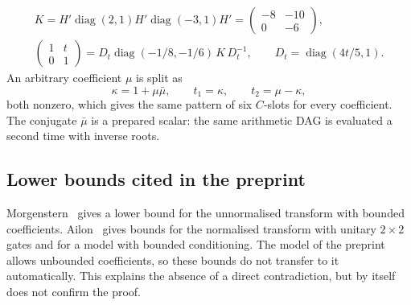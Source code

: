 \documentclass[11pt]{article}
\theoremstyle{plain}
\DeclareMathOperator{\diag}{diag}
\begin{document}
\begin{itemize}
\begin{equation}
\begin{gathered}
K=H'\diag(2,1)H'\diag(-3,1)H'=\begin{pmatrix}-8&-10\\0&-6\end{pmatrix},\\
\begin{pmatrix}1&t\\0&1\end{pmatrix}=D_t\diag(-1/8,-1/6)\,K\,D_t^{-1},\qquad D_t=\diag(4t/5,1).
\end{gathered}
\end{equation}
An arbitrary coefficient $\mu$ is split as
\begin{equation}\label{eq:split}
\kappa=1+\mu\bar\mu,\qquad t_1=\kappa,\qquad t_2=\mu-\kappa,
\end{equation}
both nonzero, which gives the same pattern of six $C$-slots for every coefficient. The conjugate $\bar\mu$ is a prepared scalar: the same arithmetic DAG is evaluated a second time with inverse roots.
\end{itemize}

\subsection{Lower bounds cited in the preprint}\label{sec:lower-bounds}
Morgenstern~\citep{morgenstern1973} gives a lower bound for the unnormalised transform with bounded coefficients. Ailon~\citep{ailon2013,ailon2014} gives bounds for the normalised transform with unitary $2\times2$ gates and for a model with bounded conditioning. The model of the preprint allows unbounded coefficients, so these bounds do not transfer to it automatically. This explains the absence of a direct contradiction, but by itself does not confirm the proof.
\end{document}

